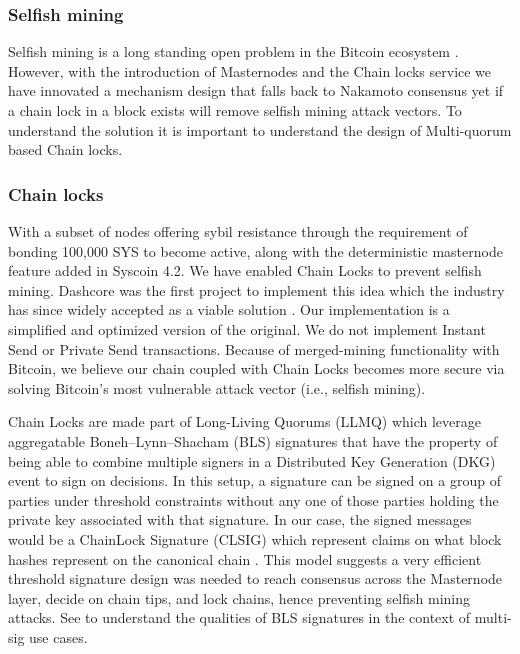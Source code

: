 \documentclass[peerreview]{ieeesyscoin}
\begin{document}
\subsubsection{Selfish mining}

Selfish mining is a long standing open problem in the Bitcoin ecosystem \cite{Eya18}. However, with the introduction of Masternodes and the Chain locks service we have innovated a mechanism design that falls back to Nakamoto consensus yet if a chain lock in a block exists will remove selfish mining attack vectors. To understand the solution it is important to understand the design of Multi-quorum based Chain locks.

\subsubsection{Chain locks}

With a subset of nodes offering sybil resistance through the requirement of bonding 100,000 SYS to become active, along with the deterministic masternode feature added in Syscoin 4.2. We have enabled Chain Locks to prevent selfish mining. Dashcore was the first project to implement this idea \cite{Blo18} which the industry has since widely accepted as a viable solution \cite{Val19}. Our implementation is a simplified and optimized version of the original. We do not implement Instant Send or Private Send transactions. Because of merged-mining functionality with Bitcoin, we believe our chain coupled with Chain Locks becomes more secure via solving Bitcoin’s most vulnerable attack vector (i.e., selfish mining). 

Chain Locks are made part of Long-Living Quorums (LLMQ) which leverage aggregatable Boneh–Lynn–Shacham (BLS) signatures that have the property of being able to combine multiple signers in a Distributed Key Generation (DKG) event to sign on decisions. In this setup, a signature can be signed on a group of parties under threshold constraints without any one of those parties holding the private key associated with that signature. In our case, the signed messages would be a ChainLock Signature (CLSIG) which represent claims on what block hashes represent on the canonical chain \cite{Blo18}. This model suggests a very efficient   threshold signature design was needed to reach consensus across the Masternode layer, decide on chain tips, and lock chains, hence preventing selfish mining attacks. See \cite{Bon18} to understand the qualities of BLS signatures in the context of multi-sig use cases.
\end{document}
